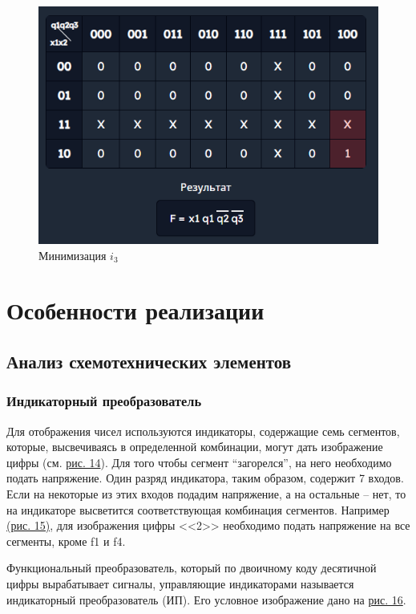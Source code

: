 \documentclass[10pt,a4paper,final]{article} %
\begin{document}
\begin{figure}[htpb]
\begin{minipage}{0.3\textwidth}
		\includegraphics[scale=0.45]{img/i3.png}
		\caption{Минимизация $i_3$}
	\end{minipage}
	\label{i} 
\end{figure}



\newpage
\section{Особенности реализации}
\subsection{Анализ схемотехнических элементов}
\subsubsection{Индикаторный преобразователь}
Для отображения чисел используются  индикаторы, содержащие семь сегментов, которые, высвечиваясь в определенной комбинации, могут 
дать изображение цифры (см. \hyperref[indicator]{рис. 14}).  Для того чтобы сегмент “загорелся”, на него необходимо подать напряжение. Один разряд индикатора, таким образом, содержит 7 входов. Если на некоторые из этих входов подадим напряжение, а на остальные – нет, то на индикаторе высветится соответствующая комбинация сегментов. Например \hyperref[digit2]{(рис. 15)}, для изображения цифры <<2>> необходимо подать напряжение на все сегменты, кроме f1 и f4. 

Функциональный преобразователь, который по двоичному 
коду десятичной цифры вырабатывает сигналы, управляющие индикаторами называется индикаторный преобразователь (ИП). Его условное изображение дано на  \hyperref[IC]{рис. 16}. 
\end{document}
